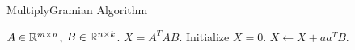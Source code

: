 \begin{algorithm}[tb]
  \caption{{\sc MultiplyGramian} Algorithm}
  \label{alg:gram}
  \begin{algorithmic}[1]
    \Require $A \in \mathbb{R}^{m\times n}$, $B \in \mathbb{R}^{n\times k}$.
    \Ensure $X = A^T A B$.
    \State Initialize $X = 0$.
        \State $X \gets X + a a^T B$.
    \EndFor
  \end{algorithmic}
\end{algorithm}



